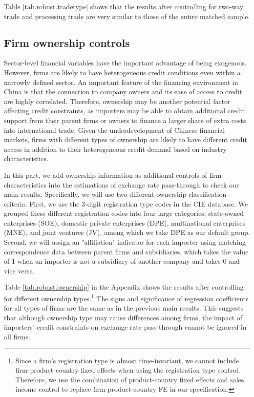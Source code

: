 Table \ref{tab.robust.tradetype} shows that the results after controlling for two-way trade and processing trade are very similar to those of the entire matched sample.

\subsection{Firm ownership controls}

Sector-level financial variables have the important advantage of being exogenous. However, firms are likely to have heterogeneous credit conditions even within a narrowly defined sector. An important feature of the financing environment in China is that the connection to company owners and its ease of access to credit are highly correlated. Therefore, ownership may be another potential factor affecting credit constraints, as importers may be able to obtain additional credit support from their parent firms or owners to finance a larger share of extra costs into international trade. Given the underdevelopment of Chinese financial markets, firms with different types of ownership are likely to have different credit access in addition to their heterogeneous credit demand based on industry characteristics. 

In this part, we add ownership information as additional controls of firm characteristics into the estimations of exchange rate pass-through to check our main results. Specifically, we will use two different ownership classification criteria. First, we use the 3-digit registration type codes in the CIE database. We grouped these different registration codes into four large categories: state-owned enterprises (SOE), domestic private enterprises (DPE), multinational enterprises (MNE), and joint ventures (JV), among which we take DPE as our default group. Second, we will assign an "affiliation" indicator for each importer using matching correspondence data between parent firms and subsidiaries, which takes the value of 1 when an importer is not a subsidiary of another company and takes 0 and vice versa. 

Table \ref{tab.robust.ownership} in the Appendix shows the results after controlling for different ownership types.\footnote{Since a firm's registration type is almost time-invariant, we cannot include firm-product-country fixed effects when using the registration type control. Therefore, we use the combination of product-country fixed effects and sales income control to replace firm-product-country FE in our specification.} The signs and significance of regression coefficients for all types of firms are the same as in the previous main results. This suggests that although ownership type may cause differences among firms, the impact of importers' credit constraints on exchange rate pass-through cannot be ignored in all firms.

